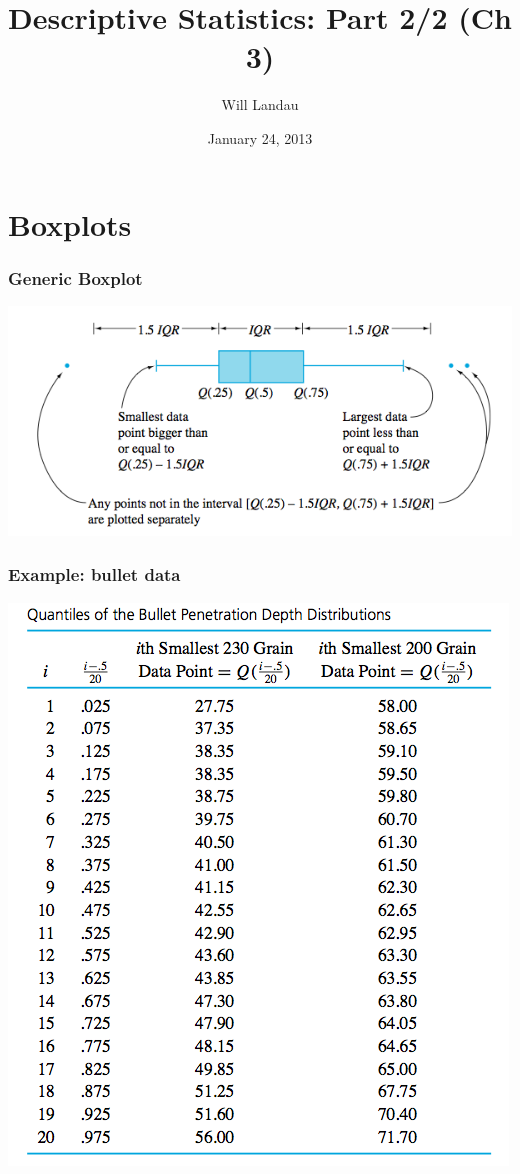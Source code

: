 \documentclass{beamer}\usepackage{graphicx, color}
\title{Descriptive Statistics: Part 2/2 (Ch 3)}
\author{Will Landau}
\date{January 24, 2013}
\institute{Iowa State University}
\numberwithin{equation}{section}
\begin{document}
\begin{frame}
\titlepage
 \end{frame}
 


\section{Boxplots}

\begin{frame}
\frametitle{Generic Boxplot}
\begin{center}
 \includegraphics{../../fig/genericbox.png}
\end{center}
\end{frame}

\begin{frame}
\frametitle{Example: bullet data}
\begin{center}
 \includegraphics{../../fig/bulletquantiles.png}
\end{center}
\end{frame}
\end{document}
